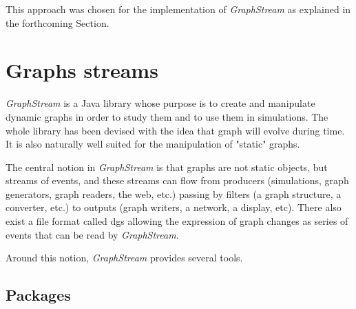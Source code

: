\documentclass{svmult}
\begin{document}
This approach was chosen for the implementation of \emph{GraphStream} as
explained in the forthcoming Section. 









\section{Graphs streams}


\emph{GraphStream} \cite{GraphStream} is a Java library whose purpose is to
create and manipulate dynamic graphs in order to study them and to use them in
simulations.  
The whole library has been devised with the idea that graph will evolve during
time. 
It is also naturally well suited for the manipulation of "static" graphs.

The central notion in \emph{GraphStream} is that graphs are not static
objects, but streams of events, and these streams can flow from producers
(simulations, graph generators, graph readers, the web, etc.) passing by
filters (a graph structure, a converter, etc.) to outputs (graph writers, a 
network, a display, etc). There also exist a file format called {\sc dgs}
allowing the expression of graph changes as series of events that can be read
by \emph{GraphStream}.      

Around this notion, \emph{GraphStream} provides several tools.

\subsection{Packages}
\end{document}
